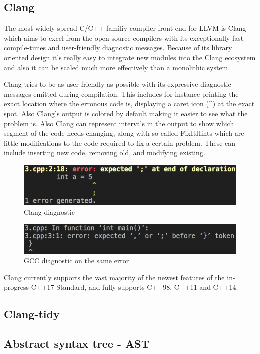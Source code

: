 \subsection{Clang}
\par The most widely spread C/C++ familiy compiler front-end for LLVM is Clang which aims to excel from the open-source compilers with its exceptionally fast compile-times and user-friendly diagnostic messages\cite{clang_features}. Because of its library oriented design it's really easy to integrate new modules into the Clang ecosystem and also it can be scaled much more effectively than a monolithic system. \medskip
\par Clang tries to be as user-friendly as possible with its expressive diagnostic messages emitted during compilation. This includes for instance printing the exact location where the erronous code is, displaying a caret icon (\^{}) at the exact spot. Also Clang's output is colored by default making it easier to see what the problem is. Also Clang can represent intervals in the output to show which segment of the code needs changing, along with so-called FixItHints which are little modifications to the code required to fix a certain problem. These can include inserting new code, removing old, and modifying existing.
\begin{figure}[h]
	\caption{Clang diagnostic}
	\includegraphics[scale = 0.4]{images/clang_diag}
\end{figure}
\begin{figure}[h]
	\caption{GCC diagnostic on the same error}
	\includegraphics[scale = 0.337]{images/gcc_diag}
\end{figure}
\par Clang currently supports the vast majority of the newest features of the in-progress C++17 Standard, and fully supports C++98, C++11 and C++14\cite{clang_language_support}. 
\subsection{Clang-tidy}
\subsection{Abstract syntax tree - AST}
